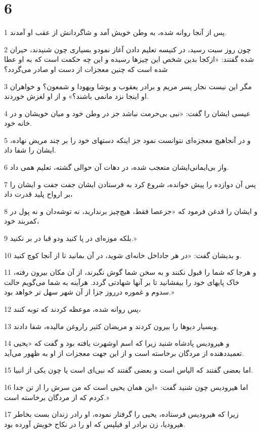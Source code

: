 \chapter{6}

\par 1 پس از آنجا روانه شده، به وطن خویش آمد و شاگردانش از عقب او آمدند.
\par 2 چون روز سبت رسید، در کنیسه تعلیم دادن آغاز نمودو بسیاری چون شنیدند، حیران شده گفتند: «ازکجا بدین شخص این چیزها رسیده و این چه حکمت است که به او عطا شده است که چنین معجزات از دست او صادر می‌گردد؟
\par 3 مگر این نیست نجار پسر مریم و برادر یعقوب و یوشا ویهودا و شمعون؟ و خواهران او اینجا نزد مانمی باشند؟» و از او لغزش خوردند.
\par 4 عیسی ایشان را گفت: «نبی بی‌حرمت نباشد جز در وطن خود و میان خویشان و در خانه خود.
\par 5 و در آنجاهیچ معجزه‌ای نتوانست نمود جز اینکه دستهای خود را بر چند مریض نهاده، ایشان را شفا داد.
\par 6 واز بی‌ایمانی‌ایشان متعجب شده، در دهات آن حوالی گشته، تعلیم همی داد.
\par 7 پس آن دوازده را پیش خوانده، شروع کرد به فرستادن ایشان جفت جفت و ایشان را بر ارواح پلید قدرت داد،
\par 8 و ایشان را قدغن فرمود که «جزعصا فقط، هیچ‌چیز برندارید، نه توشه‌دان و نه پول در کمربند خود،
\par 9 بلکه موزه‌ای در پا کنید ودو قبا در بر نکنید.»
\par 10 و بدیشان گفت: «در هر جاداخل خانه‌ای شوید، در آن بمانید تا از آنجا کوچ کنید.
\par 11 و هرجا که شما را قبول نکنند و به سخن شما گوش نگیرند، از آن مکان بیرون رفته، خاک پایهای خود را بیفشانید تا بر آنها شهادتی گردد. هرآینه به شما می‌گویم حالت سدوم و غموره درروز جزا از آن شهر سهل تر خواهد بود.»
\par 12 پس روانه شده، موعظه کردند که توبه کنند،
\par 13 وبسیار دیوها را بیرون کردند و مریضان کثیر راروغن مالیده، شفا دادند.
\par 14 و هیرودیس پادشاه شنید زیرا که اسم اوشهرت یافته بود و گفت که «یحیی تعمید‌دهنده از مردگان برخاسته است و از این جهت معجزات از او به ظهور می‌آید.
\par 15 اما بعضی گفتند که الیاس است و بعضی گفتند که نبی‌ای است یا چون یکی از انبیا.
\par 16 اما هیرودیس چون شنید گفت: «این همان یحیی است که من سرش را از تن جدا کردم که از مردگان برخاسته است.»
\par 17 زیرا که هیرودیس فرستاده، یحیی را گرفتار نموده، او رادر زندان بست بخاطر هیرودیا، زن برادر او فیلپس که او را در نکاح خویش آورده بود.
